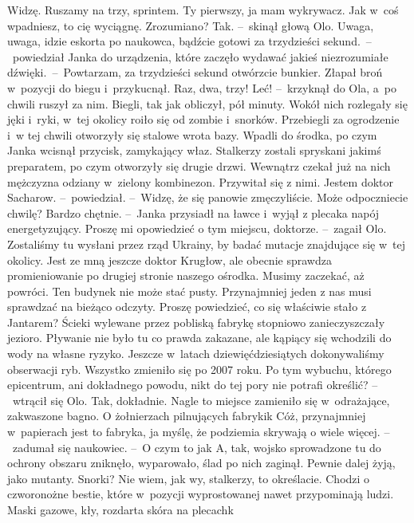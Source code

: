 \documentclass[../MAIN.tex]{subfiles}
\begin{document}
\xx Widzę.
\xx Ruszamy na trzy, sprintem. Ty pierwszy, ja mam wykrywacz. Jak w~coś wpadniesz, to cię wyciągnę. Zrozumiano?
\xx Tak. --~skinął głową Olo.
\xx Uwaga, uwaga, idzie eskorta po naukowca, bądźcie gotowi za trzydzieści sekund.~--~powiedział Janka do urządzenia, które zaczęło wydawać jakieś niezrozumiałe dźwięki.~--~Powtarzam, za trzydzieści sekund otwórzcie bunkier.
\qm
Złapał broń w~pozycji do biegu i~przykucnął.
\sx Raz, dwa, trzy! Leć! --~krzyknął do Ola, a~po chwili ruszył za nim.
\qd
\hspace{30.5em}Biegli, tak jak obliczył, pół minuty. Wokół nich rozlegały się jęki i~ryki, w~tej okolicy roiło się od zombie i~snorków. Przebiegli za ogrodzenie i~w tej chwili otworzyły się stalowe wrota bazy. Wpadli do środka, po czym Janka wcisnął przycisk, zamykający właz. Stalkerzy zostali spryskani jakimś preparatem, po czym otworzyły się drugie drzwi. Wewnątrz czekał już na nich mężczyzna odziany w~zielony kombinezon. Przywitał się z nimi.
\sx Jestem doktor Sacharow. --~powiedział. --~Widzę, że się panowie zmęczyliście. Może odpoczniecie chwilę?
\xx Bardzo chętnie. --~Janka przysiadł na ławce i~wyjął z plecaka napój energetyzujący.
\xx Proszę mi opowiedzieć o tym miejscu, doktorze. --~zagaił Olo.
\xx Zostaliśmy tu wysłani przez rząd Ukrainy, by badać mutacje znajdujące się w~tej okolicy. Jest ze mną jeszcze doktor Krugłow, ale obecnie sprawdza promieniowanie po drugiej stronie naszego ośrodka. Musimy zaczekać, aż powróci. Ten budynek nie może stać pusty. Przynajmniej jeden z nas musi sprawdzać na bieżąco odczyty.
\xx Proszę powiedzieć, co się właściwie stało z Jantarem?
\xx Ścieki wylewane przez pobliską fabrykę stopniowo zanieczyszczały jezioro. Pływanie nie było tu co prawda zakazane, ale kąpiący się wchodzili do wody na własne ryzyko. Jeszcze w~latach dziewięćdziesiątych dokonywaliśmy obserwacji ryb. Wszystko zmieniło się po 2007 roku.
\xx Po tym wybuchu, którego epicentrum, ani dokładnego powodu, nikt do tej pory nie potrafi określić? --~wtrącił się Olo.
\xx Tak, dokładnie. Nagle to miejsce zamieniło się w~odrażające, zakwaszone bagno. O żołnierzach pilnujących fabryki\3k Cóż, przynajmniej w~papierach jest to fabryka, ja myślę, że podziemia skrywają o wiele więcej. --~zadumał się naukowiec. --~O czym to ja\3k A, tak, wojsko sprowadzone tu do ochrony obszaru zniknęło, wyparowało, ślad po nich zaginął. Pewnie dalej żyją, jako mutanty.
\xx Snorki?
\xx Nie wiem, jak wy, stalkerzy, to określacie. Chodzi o czworonożne bestie, które w~pozycji wyprostowanej nawet przypominają ludzi. Maski gazowe, kły, rozdarta skóra na plecach\3k
\end{document}
